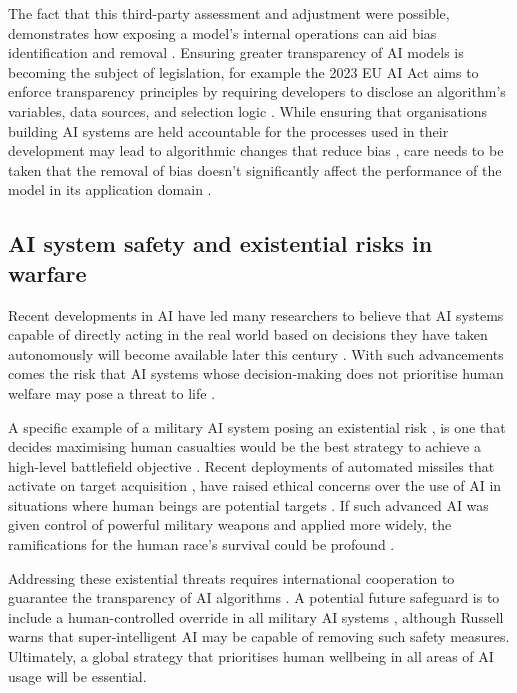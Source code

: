 \documentclass[a4paper, 11pt]{article}
\begin{document}
The fact that this third-party assessment and adjustment were possible, demonstrates how exposing a model’s internal operations 
can aid bias identification and removal \cite{Seroussi2020, Winter2023}. 
Ensuring greater transparency of AI models is becoming the subject of legislation, 
for example the 2023 EU AI Act aims to enforce transparency principles by requiring developers to disclose an 
algorithm’s variables, data sources, and selection logic \cite{EuropeanParliament2023, Edwards2021}. 
While ensuring that organisations building AI systems are held accountable for the processes used in their development 
may lead to algorithmic changes that reduce bias \cite{Donovan2018, Lawry2020}, 
care needs to be taken that the removal of bias doesn't significantly affect the performance of the model 
in its application domain \cite{Kearns2020}.

\subsection*{AI system safety and existential risks in warfare}

Recent developments in AI have led many researchers to believe that AI systems capable of directly acting 
in the real world based on decisions they have taken autonomously will become available later this century \cite{Grace2018}. 
With such advancements comes the risk that AI systems whose decision-making does not prioritise human welfare 
may pose a threat to life \cite{Ord2020}. 

A specific example of a military AI system posing an existential risk \cite{yampolskiy2016, Cummings2017}, 
is one that decides maximising human casualties would be the best strategy to achieve a high-level battlefield objective \cite{Barrat2013}. 
Recent deployments of automated missiles that activate on target acquisition \cite{Atherton2021, BodeWatts2023}, 
have raised ethical concerns over the use of AI in situations where human beings are potential targets \cite{Emery2021}. 
If such advanced AI was given control of powerful military weapons and applied more widely, 
the ramifications for the human race's survival could be profound \cite{Tegmark2017}. 

Addressing these existential threats requires international cooperation 
to guarantee the transparency of AI algorithms \cite{Cihon2019, Leslie2019}. 
A potential future safeguard is to include a human-controlled override in all military AI systems \cite{CritchKrueger2020}, 
although Russell \cite{Russell2019} warns that super-intelligent AI may be capable of removing such safety measures. 
Ultimately, a global strategy that prioritises human wellbeing in all areas of AI usage will be essential.

\printbibliography
\end{document}
